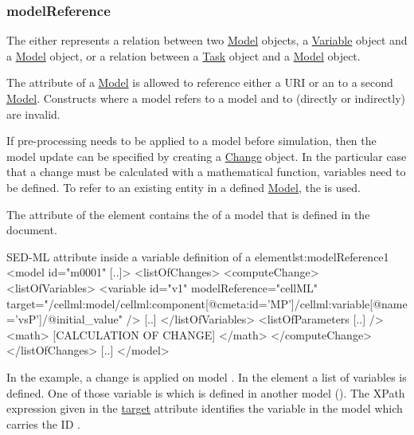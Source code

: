 \subsubsection{modelReference}
\label{sec:modelReference}
%
The  either represents a relation between two \hyperref[class:model]{Model} objects, a \hyperref[class:variable]{Variable} object and a \hyperref[class:model]{Model} object, or  a relation between a \hyperref[class:task]{Task} object and a \hyperref[class:model]{Model} object.

The  attribute of a \hyperref[class:model]{Model} is allowed to reference either a URI or an  to a second
\hyperref[class:model]{Model}. Constructs where a model  refers to a model  and  to  (directly or indirectly) are invalid.

If pre-processing needs to be applied to a model before simulation, then the model update can be specified by creating a \hyperref[class:change]{Change} object. In the particular case that a change must be calculated with a mathematical function, variables need to be defined. To refer to an existing entity in a defined \hyperref[class:model]{Model}, the  is used. 

The  attribute of the  element contains the  of a model that is defined in the document. 
%
\begin{myXmlLst}{SED-ML  attribute inside a variable definition of a   element}{lst:modelReference1}
<model id="m0001" [..]>
 <listOfChanges>
   <computeChange>
    <listOfVariables>
     <variable id="v1" modelReference="cellML" target="/cellml:model/cellml:component[@cmeta:id='MP']/cellml:variable[@name='vsP']/@initial_value" />
     [..]
    </listOfVariables>
    <listOfParameters [..] />
    <math>
     [CALCULATION OF CHANGE]
    </math>
   </computeChange>
 </listOfChanges>
 [..]
</model>
\end{myXmlLst}
%
In the example, a change is  applied on model . In the  element a list of variables is defined. One of those variable is  which is defined in another model (). 
The XPath expression given in the \hyperref[sec:target]{target} attribute identifies the variable in the model which carries the ID .

